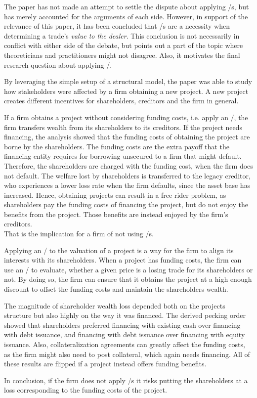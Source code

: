 \documentclass[main.tex]{subfiles}
\begin{document}
    The paper has not made an attempt to settle the dispute about applying \FVA/s,
    but has merely accounted for the arguments of each side.
    However, in support of the relevance of this paper,
    it has been concluded that \FVA/s are a necessity 
    when determining a trade's \textit{value to the dealer}.
    This conclusion is not necessarily in conflict with either side of the debate,
    but points out a part of the topic where theoreticians and practitioners might not disagree.
    Also, it motivates the final research question about applying \FVA/.

    \textbf{\researchQuestionFvaImplications}
    By leveraging the simple setup of a structural model,
    the paper was able to study how stakeholders were affected by a firm obtaining a new project.
    A new project creates different incentives for shareholders, creditors and the firm in general.

    If a firm obtains a project without considering funding costs, i.e. apply an \FVA/,
    the firm transfers wealth from its shareholders to its creditors.
    If the project needs financing, 
    the analysis showed that the funding costs 
    of obtaining the project are borne by the shareholders.
    The funding costs are the extra payoff that the financing entity requires
    for borrowing unsecured to a firm that might default.
    Therefore, the shareholders are charged with the funding cost, when the firm does not default.
    The welfare lost by shareholders is transferred to the legacy creditor,
    who experiences a lower loss rate when the firm defaults, since the asset base has increased.
    Hence, obtaining projects can result in a free rider problem, 
    as shareholders pay the funding costs of financing the project,
    but do not enjoy the benefits from the project.
    Those benefits are instead enjoyed by the firm's creditors. \\
    That is the implication for a firm of not using \FVA/s.

    Applying an \FVA/ to the valuation of a project is a way for the firm 
    to align its interests with its shareholders.
    When a project has funding costs,
    the firm can use an \FVA/ to evaluate,
    whether a given price is a losing trade for its shareholders or not.
    By doing so, the firm can ensure that it obtains the project at a high enough discount
    to offset the funding costs and maintain the shareholders wealth.

    The magnitude of shareholder wealth loss depended both on the projects structure
    but also highly on the way it was financed. 
    The derived pecking order showed that shareholders preferred 
    financing with existing cash over financing with debt issuance, 
    and financing with debt issuance over financing with equity issuance.
    Also, collateralization agreements can greatly affect the funding costs,
    as the firm might also need to post collateral, which again needs financing.
    All of these results are flipped if a project instead offers funding benefits.

    In conclusion, if the firm does not apply \FVA/s it risks putting the shareholders at a loss
    corresponding to the funding costs of the project.
\end{document}
